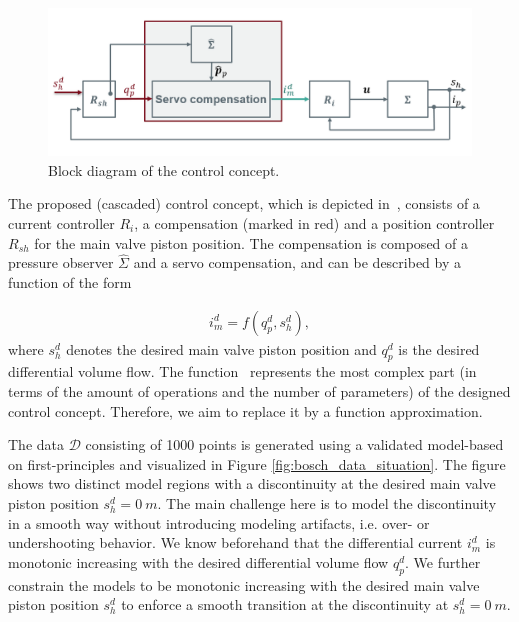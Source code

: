 \begin{figure}[H]
	\centering
	\includegraphics[width=0.8\columnwidth]{graphics/pgfplots/cha5/Bosch/blockschaltbild.png}
	\caption{Block diagram of the control concept.}
	\label{fig:blockschaltbild}
\end{figure}
%
The proposed (cascaded) control concept, which is depicted in~, consists of a current controller $R_i$, a compensation (marked in red) and a position controller $R_{sh}$ for the main valve piston position. The compensation is composed of a pressure observer $\hat{\Sigma}$ and a servo compensation, and can be described by a function of the form 

\begin{align} \label{eq:ex-2-equation}
	i_m^d = f(q_p^d, s_h^d),
\end{align}
%
where $s_h^d$ denotes the desired main valve piston position and $q_p^d$ is the desired differential volume flow. The function~ represents the most complex part (in terms of the amount of operations and the number of parameters) of the designed control concept. Therefore, we aim to replace it by a function approximation. 

The data $\mathcal{D}$ consisting of 1000 points is generated using a validated model-based on first-principles and visualized in Figure \ref{fig:bosch_data_situation}. The figure shows two distinct model regions with a discontinuity at the desired main valve piston position $s_h^d = 0 \ \si{m}$. The main challenge here is to model the discontinuity in a smooth way without introducing modeling artifacts, i.e. over- or undershooting behavior. We know beforehand that the differential current $i_m^d$ is monotonic increasing with the desired differential volume flow $q_p^d$. We further constrain the models to be monotonic increasing with the desired main valve piston position $s_h^d$ to enforce a smooth transition at the discontinuity at $s_h^d = 0 \ \si{m}$.

